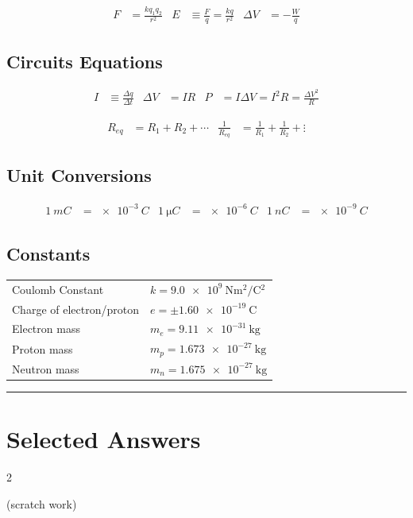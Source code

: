 \documentclass[10pt]{exam}
\def\theanswers{\theendnotes}
\begin{document}
\begin{align*}
  F &= \frac{kq_1 q_2} {r^2} &
  E &\equiv \frac{F}{q} = \frac{kq}{r^2} &
  \Delta V &= -\frac{W}{q}
\end{align*}

\subsection*{Circuits Equations}

\begin{align*}
  I &\equiv \frac{\Delta q}{\Delta t} &
  \Delta V &= IR &
  P &= I\Delta V = I^2 R = \frac{\Delta V^2}{R}
\end{align*}


\begin{align*}
  R_{eq} &= R_1 + R_2 + \cdots &
  \frac{1}{R_{eq}} &= \frac{1}{R_1} + \frac{1}{R_2} + \vdots
\end{align*}

\subsection*{Unit Conversions}

\begin{align*}
  \SI{1}{mC} &= \SI{e-3}{C} &
  \SI{1}{\micro C} &= \SI{e-6}{C} &
  \SI{1}{n C} &= \SI{e-9}{C}
\end{align*}


\subsection*{Constants}

\vspace{2em}

\begin{tabular}{ll}
Coulomb Constant          &   $k = \SI{9.0e9}{\newton\meter^2\per\coulomb^2}$\\
Charge of electron/proton &   $e=\pm\SI{1.60e-19}{\coulomb}$\\
Electron mass             &   $m_e=\SI{9.11e-31}{\kilo\gram}$\\
Proton mass	              &   $m_p=\SI{1.673e-27}{\kilo\gram}$\\
Neutron mass	            &   $m_n=\SI{1.675e-27}{\kilo\gram}$
\end{tabular}

\vs
\hrule

\section*{Selected Answers}

  \renewcommand{\enotesize}{\normalsize}
  \renewcommand{\enoteformat}{%
    \leftskip=1.8em
    \makebox[0pt][r]{\theenmark. }%
  }

  \hfill

  \begin{multicols}{2}
    \theanswers
  \end{multicols}
  \pagebreak

  (scratch work)
\end{document}
